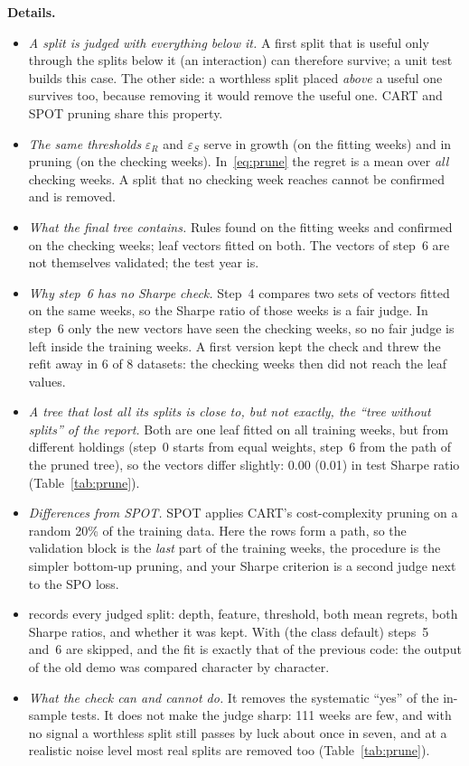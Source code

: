 \documentclass[11pt,a4paper]{article}
\newcommand{\1}{\mathbf{1}}
\newcommand{\code}[1]{\texttt{\detokenize{#1}}}
\begin{document}
\textbf{Details.}
\begin{itemize}
\item \emph{A split is judged with everything below it.} A first split that is useful only through the splits below it (an interaction) can therefore survive; a unit test builds this case. The other side: a worthless split placed \emph{above} a useful one survives too, because removing it would remove the useful one. CART and SPOT pruning share this property.
\item \emph{The same thresholds} $\varepsilon_R$ and $\varepsilon_S$ serve in growth (on the fitting weeks) and in pruning (on the checking weeks). In~\eqref{eq:prune} the regret is a mean over \emph{all} checking weeks. A split that no checking week reaches cannot be confirmed and is removed.
\item \emph{What the final tree contains.} Rules found on the fitting weeks and confirmed on the checking weeks; leaf vectors fitted on both. The vectors of step~6 are not themselves validated; the test year is.
\item \emph{Why step~6 has no Sharpe check.} Step~4 compares two sets of vectors fitted on the same weeks, so the Sharpe ratio of those weeks is a fair judge. In step~6 only the new vectors have seen the checking weeks, so no fair judge is left inside the training weeks. A first version kept the check and threw the refit away in 6 of 8 datasets: the checking weeks then did not reach the leaf values.
\item \emph{A tree that lost all its splits is close to, but not exactly, the ``tree without splits'' of the report.} Both are one leaf fitted on all training weeks, but from different holdings (step~0 starts from equal weights, step~6 from the path of the pruned tree), so the vectors differ slightly: $0.00$ (0.01) in test Sharpe ratio (Table~\ref{tab:prune}).
\item \emph{Differences from SPOT.} SPOT applies CART's cost-complexity pruning on a random 20\% of the training data. Here the rows form a path, so the validation block is the \emph{last} part of the training weeks, the procedure is the simpler bottom-up pruning, and your Sharpe criterion is a second judge next to the SPO loss.
\item \code{pruning_log} records every judged split: depth, feature, threshold, both mean regrets, both Sharpe ratios, and whether it was kept. With \code{validation_fraction=0} (the class default) steps~5 and~6 are skipped, and the fit is exactly that of the previous code: the output of the old demo was compared character by character.
\item \emph{What the check can and cannot do.} It removes the systematic ``yes'' of the in-sample tests. It does not make the judge sharp: 111 weeks are few, and with no signal a worthless split still passes by luck about once in seven, and at a realistic noise level most real splits are removed too (Table~\ref{tab:prune}).
\end{itemize}
\end{document}

